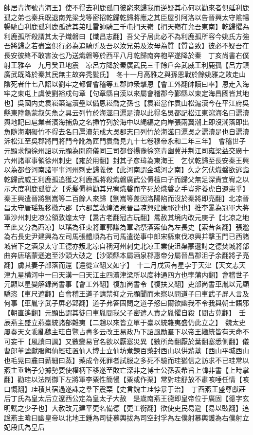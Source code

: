 帥居青海號青海王】使不得去利鹿孤曰彼窮來歸我而逆疑其心何以勸來者俱延利鹿孤之弟也秦兵既退南羌梁戈等密招乾歸乾歸將應之其臣屋引阿洛以告晉興太守隂暢暢馳白利鹿孤利鹿孤遣其弟吐雷帥騎三千屯捫天嶺【捫天嶺在允吾東南】乾歸懼為利鹿孤所殺謂其太子熾磐曰【熾昌志翻】吾父子居此必不為利鹿孤所容今姚氏方強吾將歸之若盡室俱行必為追騎所及吾以汝兄弟及汝母為質【質音致】彼必不疑吾在長安彼終不敢害汝也乃送熾磐等於西平八月乾歸南奔枹罕遂降於秦　丁亥尚書右僕射王雅卒　九月癸丑地震　凉呂方降於秦廣武民三千餘戶奔武威王利鹿孤【呂方鎮廣武既降於秦其民無主故奔秃髪氏】　冬十一月高雅之與孫恩戰於餘姚雅之敗走山陰死者什七八詔以劉牢之都督會稽等五郡帥衆擊恩【會工外翻帥讀曰率】恩走入海牢之東屯上虞使劉裕戍句章【句章縣自漢以來屬會稽郡今鄞縣以東定海昌國皆其地也】吳國内史袁崧築滬瀆壘以備恩崧喬之孫也【袁崧當作袁山松滬瀆今在平江府吳縣東陸龜蒙叙矢魚之具云列竹於海澨曰滬是瀆以此得名吳都記松江東瀉海名曰滬瀆輿地記曰扈業者濱海捕魚之名挿竹列於海中以䋲編之向岸張兩翼潮上即沒潮落即出魚隨海潮礙竹不得去名曰扈瀆范成大吳郡志曰列竹於海澨曰滬吳之滬瀆是也自滬瀆泝松江至吳郡將門將門今訛為匠門袁喬見九十七卷穆帝永和二年三年】　會稽世子元顯求領徐州詔以元顯為開府儀同三司都督揚豫徐兖青幽冀并荆江司雍梁益交廣十六州諸軍事領徐州刺史【雍於用翻】封其子彦瑋為東海王　乞伏乾歸至長安秦王興以為都督河南諸軍事河州刺史歸義侯【此河南謂金城河之南】久之乞伏熾磐欲逃詣乾歸武威王利鹿孤追獲之利鹿孤將殺熾磐廣武公傉檀曰子而歸父無足深責宜宥之以示大度利鹿孤從之【秃髪傉檀勸其兄宥熾磬而卒死於熾磐之手豈非養虎自遺患乎】　秦王興遣晉將劉嵩等二百餘人來歸【劉嵩等盖因洛陽陷而沒於秦將即亮翻】北凉晉昌太守唐瑶叛移檄六郡【六郡盖敦煌酒泉晉昌凉興建康祁連也】推李暠為冠軍大將軍沙州刺史凉公領敦煌太守【暠古老翻冠古玩翻】暠赦其境内改元庚子【北凉之地至此又分為西凉】以瑤為征東將軍郭謙為軍諮祭酒索仙為左長史【索昔各翻】張邈為右長史尹建興為左司馬張體順為右司馬遣從事中郎宋繇東伐凉興并擊玉門已西諸城皆下之酒泉太守王德亦叛北凉自稱河州刺史北凉王業使沮渠蒙遜討之德焚城將部曲奔唐瑤蒙遜追至沙頭大破之【沙頭縣本屬酒泉郡惠帝分屬晉昌郡沮子余翻將子亮翻】虜其妻子部落而還【還從宣翻又如字】　十二月戊寅有星孛于天津【天文志天津九星横河中一曰天漢一曰天江主四瀆津梁所以度神通四方也孛蒲内翻】會稽世子元顯以星變解録尚書事【會工外翻】復加尚書令【復扶又翻】吏部尚書車胤以元顯驕恣【車尺遮翻】白會稽王道子請禁抑之元顯聞而未察以問道子曰車武子屏人言及何事【車胤字武子屏必郢翻】道子弗答固問之道子怒曰爾欲幽我不令我與朝士語邪【朝直遙翻】元顯出謂其徒曰車胤間我父子密遣人責之胤懼自殺【間古莧翻】　壬辰燕主盛立燕臺統諸部雜夷【二趙以來皆立單于臺以統雜夷盛仍此立之】　魏太史屢奏天文乖亂魏主珪自覽占書多云改王易政乃下詔風勵羣下以帝王繼統皆有天命不可妄干【風讀曰諷】又數變易官名欲以厭塞災異【數所角翻厭於葉翻塞悉側翻】儀曹郎董謐獻服餌仙經珪置仙人博士立仙坊煮鍊百藥封西山以供薪蒸【西山平城西山也毛晃曰麄曰薪細曰蒸】藥成令死罪者試服之多死不驗而珪猶信之訪求不已珪常以燕主垂諸子分據勢要使權柄下移遂至敗亡深非之博士公孫表希旨上韓非書【上時掌翻】勸珪以法制御下左將軍李粟性簡慢【粟或作栗】常對珪舒放不肅咳唾任情【咳口慨翻】珪積其宿過遂誅之羣下震栗【史言魏主珪悖暴于治】　丁酉燕王盛尊獻莊后丁氏為皇太后立遼西公定為皇太子大赦　是歲南燕王德即皇帝位于廣固【德字玄明皝之少子也】大赦改元建平更名備德【更工衡翻】欲使吏民易避【易以豉翻】追諡燕主暐曰幽皇帝以北地王鍾為司徒慕輿拔為司空封孚為左僕射慕輿護為右僕射立妃段氏為皇后

